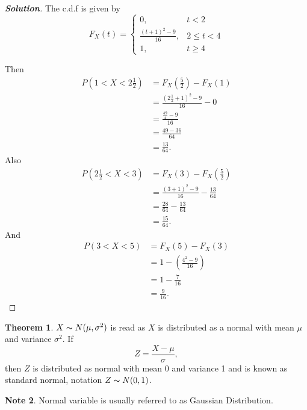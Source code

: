 \documentclass[12pt,a4paper]{report}
\theoremstyle{definition}
\newtheorem{thm}{Theorem}[section]
\newtheorem{note}[thm]{Note}
\theoremstyle{plain}
\theoremstyle{definition}
\begin{document}
\begin{proof}[\textbf{\textit{Solution}}]
The c.d.f is given by
\[F_X(t)=
\begin{cases}
0, & t<2\\
\frac{(t+1)^2-9}{16}, & 2\leq t<4\\
1, & t\geq 4
\end{cases}
\]

Then 
\begin{align*}
P\left(1<X<2\frac{1}{2}\right) & =F_X\left(\frac{5}{2}\right)-F_X(1)\\
                              & = \frac{(2\frac{1}{2}+1)^2-9}{16}-0\\
                              & = \frac{\frac{49}{4}-9}{16}\\
                              & = \frac{49-36}{64}\\
                              & = \frac{13}{64}.
\end{align*}
Also
\begin{align*}
P\left(2\frac{1}{2} < X < 3\right) & = F_X(3) - F_X\left(\frac{5}{2}\right)\\
& = \frac{(3 + 1)^2 -9}{16}-\frac{13}{64}\\
& = \frac{28}{64}-\frac{13}{64}\\
& =\frac{15}{64}.
\end{align*}
And
\begin{align*}
P(3<X<5) &=F_X(5)-F_X(3)\\ 
&=1-\left(\frac{4^2-9}{16}\right)\\
& =1-\frac{7}{16}\\
&=\frac{9}{16}.
\end{align*}
\end{proof}














\begin{thm}
$X\thicksim N(\mu,\sigma^2)$ is read as $X$ is distributed as a normal with mean $\mu$ and variance $\sigma^2$.
If \[Z=\frac{X-\mu}{\sigma},\] then $Z$ is distributed as normal with mean 0 and variance 1 and is known as standard normal, notation $Z\thicksim N(0,1)$.
\end{thm}


\begin{note}
Normal variable is usually referred to as Gaussian Distribution.
\end{note}
\end{document}
